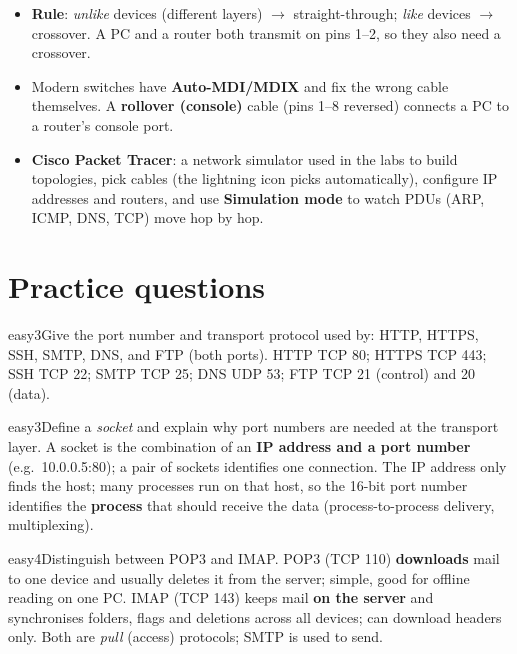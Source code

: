 \documentclass[10pt]{article}
\begin{document}
\begin{itemize}
\item \textbf{Rule}: \emph{unlike} devices (different layers) $\to$ straight-through; \emph{like} devices $\to$ crossover. A PC and a router both transmit on pins 1--2, so they also need a crossover.
\item Modern switches have \textbf{Auto-MDI/MDIX} and fix the wrong cable themselves. A \textbf{rollover (console)} cable (pins 1--8 reversed) connects a PC to a router's console port.
\item \textbf{Cisco Packet Tracer}: a network simulator used in the labs to build topologies, pick cables (the lightning icon picks automatically), configure IP addresses and routers, and use \textbf{Simulation mode} to watch PDUs (ARP, ICMP, DNS, TCP) move hop by hop.
\end{itemize}

\section{Practice questions}
\setcounter{pq}{0}

\begin{practice}{easy}{3}Give the port number and transport protocol used by: HTTP, HTTPS, SSH, SMTP, DNS, and FTP (both ports).
\sol HTTP TCP 80; HTTPS TCP 443; SSH TCP 22; SMTP TCP 25; DNS UDP 53; FTP TCP 21 (control) and 20 (data).
\end{practice}

\begin{practice}{easy}{3}Define a \emph{socket} and explain why port numbers are needed at the transport layer.
\sol A socket is the combination of an \textbf{IP address and a port number} (e.g.\ 10.0.0.5:80); a pair of sockets identifies one connection. The IP address only finds the host; many processes run on that host, so the 16-bit port number identifies the \textbf{process} that should receive the data (process-to-process delivery, multiplexing).
\end{practice}

\begin{practice}{easy}{4}Distinguish between POP3 and IMAP.
\sol POP3 (TCP 110) \textbf{downloads} mail to one device and usually deletes it from the server; simple, good for offline reading on one PC. IMAP (TCP 143) keeps mail \textbf{on the server} and synchronises folders, flags and deletions across all devices; can download headers only. Both are \emph{pull} (access) protocols; SMTP is used to send.
\end{practice}
\end{document}
